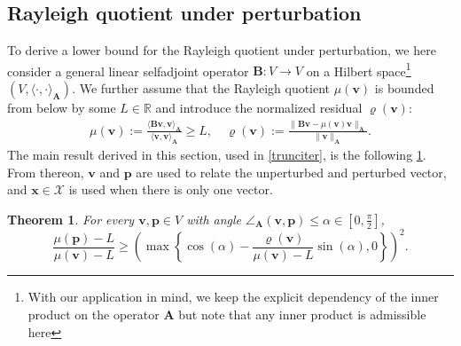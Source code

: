 \documentclass[a4paper,11pt,oneside]{amsart}
\newtheorem{theorem}{Theorem}
\theoremstyle{definition}
\theoremstyle{remark}
\newcommand{\R}{\mathbb{R}}
\newcommand{\ten}[1]{\boldsymbol{#1}}
\numberwithin{equation}{section}
\numberwithin{theorem}{section}
\begin{document}
\begin{appendix}
\subsection{Rayleigh quotient under perturbation}\label{sec:rayqup}
To derive a lower bound for the Rayleigh quotient under perturbation, we here consider a general  linear selfadjoint operator $\ten B: V \rightarrow V$ on a Hilbert space\footnote{With our application in mind, we keep the explicit dependency of the inner product on the operator $\ten A$ but note that any inner product is admissible here} $(V,\langle \cdot, \cdot \rangle_{\ten A})$. We further assume that the Rayleigh quotient $\mu(\ten v)$ is bounded from below by some $L \in \R$ and introduce the normalized residual $\varrho(\ten v)$:
%
%
\begin{align*}
 \mu(\ten v) := \frac{\langle \ten B \ten v, \ten v \rangle_{\ten A}}{\langle \ten v, \ten v \rangle_{\ten A}} \geq L, \quad \varrho(\ten v) := \frac{\|\ten B \ten v - \mu(\ten v) \ten v\|_{\ten A}}{\|\ten v\|_{\ten A}}.
\end{align*}
 The main result derived in this section, used in \cref{trunciter}, is the following \cref{thm:pertbound}. From thereon, $\ten v$ and $\ten p$ are used to relate the unperturbed and perturbed vector, and $\ten x \in \mathcal{X}$ is used when there is only one vector.
%
%
%
%
%
%

\begin{theorem}\label{thm:pertbound}
For every $\ten v,\ten p \in V$ with angle $\angle_{\ten A}(\ten v,\ten p) \leq \alpha \in [0,\frac{\pi}{2}]$, 
%
%
%
\begin{equation}\label{eq:thm:pertbound}
 \frac{\mu(\ten p) - L}{\mu(\ten v) - L} \geq \left(  \max\left\{ \cos(\alpha) - \frac{\varrho(\ten v) }{\mu(\ten v) - L}\sin(\alpha) , 0 \right\} \right)^2.
\end{equation}%
%
%
%
%
%
\end{theorem}%


\end{appendix}
\end{document}
